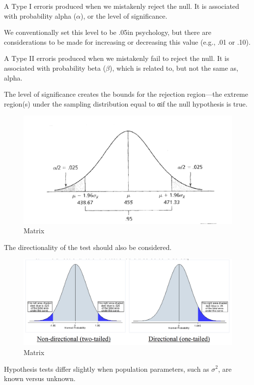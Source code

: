 \documentclass[]{book}
\theoremstyle{definition}
\theoremstyle{definition}
\theoremstyle{definition}
\theoremstyle{remark}
\begin{document}
A Type I erroris produced when we mistakenly reject the null. It is
associated with probability alpha (\(\alpha\)), or the level of
significance.

We conventionally set this level to be .05in psychology, but there are
considerations to be made for increasing or decreasing this value (e.g.,
.01 or .10).

A Type II erroris produced when we mistakenly fail to reject the null.
It is associated with probability beta (\(\beta\)), which is related to,
but not the same as, alpha.

The level of significance creates the bounds for the rejection
region---the extreme region(s) under the sampling distribution equal to
αif the null hypothesis is true.

\begin{figure}
\centering
\includegraphics{img/hicksonesample4.png}
\caption{Matrix}
\end{figure}

The directionality of the test should also be considered.

\begin{figure}
\centering
\includegraphics{img/hicksonesample5.png}
\caption{Matrix}
\end{figure}

Hypothesis tests differ slightly when population parameters, such as
\(\sigma^2\), are known versus unknown.
\end{document}
